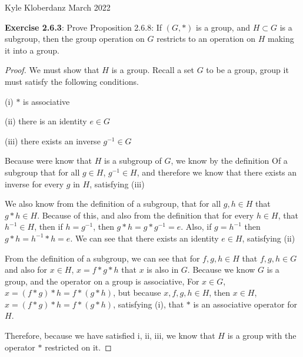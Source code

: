 \documentclass[a4paper]{article}
\begin{document}
\begin{myparindent}{0pt}

Kyle Kloberdanz  March 2022 \newline

\textbf{Exercise 2.6.3}:
Prove Proposition 2.6.8: If $(G, *)$ is a group, and $H \subset G$ is a
subgroup, then the group operation on $G$ restricts to an operation on $H$
making it into a group. \newline

\begin{proof}
  We must show that $H$ is a group. Recall a set $G$ to be a group, group it
  must satisfy the following conditions.

  (i) $*$ is associative

  (ii) there is an identity $e \in G$

  (iii) there exists an inverse $g^{-1} \in G$
  \newline

  Because were know that $H$ is a subgroup of $G$, we know by the definition Of
  a subgroup that for all $g \in H$, $g^{-1} \in H$, and therefore we know that
  there exists an inverse for every $g$ in $H$, satisfying (iii) \newline

  We also know from the definition of a subgroup, that for all $g, h \in H$ that
  $g * h \in H$. Because of this, and also from the definition that for every
  $h \in H$, that $h^{-1} \in H$, then if $h = g^{-1}$, then
  $g * h = g * g^{-1} = e$. Also, if $g = h^{-1}$ then $g * h = h^{-1} * h = e$.
  We can see that there exists an identity $e \in H$, satisfying (ii) \newline

  From the definition of a subgroup, we can see that for $f, g, h \in H$ that
  $f, g, h \in G$ and also for $x \in H$, $x = f * g * h$ that $x$ is also in
  $G$. Because we know $G$ is a group, and the operator on a group is
  associative, For $x \in G$, $x = (f * g) * h = f * (g * h)$, but because
  $x, f, g, h \in H$, then $x \in H$, $x = (f * g) * h = f * (g * h)$,
  satisfying (i), that $*$ is an associative operator for $H$. \newline

  Therefore, because we have satisfied i, ii, iii, we know that $H$ is a group
  with the operator $*$ restricted on it.
  \newline
\end{proof}


\end{myparindent}
\end{document}
